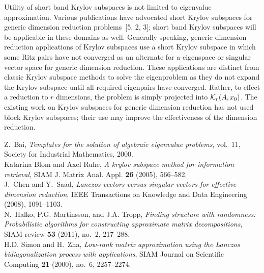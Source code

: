 \documentclass{report}
\begin{document}
Utility of short band Krylov subspaces is not limited to eigenvalue
approximation. Various publications have advocated short Krylov
subspaces for generic dimension reduction problems~[5, 2, 3]; short band Krylov
subspaces will be applicable in these domains as well. Generally
speaking, generic dimension reduction applications of Krylov subspaces
use a short Krylov subspace in which some Ritz pairs have not
converged as an alternate for a eigenspace or singular vector space
for generic dimension reduction. These applications are distinct from
classic Krylov subspace methods to solve the eigenproblem as they do
not expand the Krylov subspace until all required eigenpairs have
converged. Rather, to effect a reduction to $r$ dimensions, the
problem is simply projected into $\mathcal K_{r}(A,x_0)$. The existing work
on Krylov subspaces for generic dimension reduction has not used block
Krylov subspaces; their use may improve the effectiveness of the
dimension reduction.\\


\newcommand{\bysame}{\leavevmode\hbox to3em{\hrulefill}\thinspace}

\noindent [1] Z.~Bai, \emph{Templates for the solution of algebraic eigenvalue problems},
vol.~11, Society for Industrial Mathematics, 2000. \\

\noindent [2] Katarina Blom and Axel Ruhe, \emph{A krylov subspace method
for information retrieval}, SIAM J.
Matrix Anal. Appl. \textbf{26} (2005), 566--582. \\

\noindent [3] J.~Chen and Y.~Saad, \emph{{Lanczos vectors versus singular vectors for
effective dimension reduction}}, IEEE Transactions on Knowledge and Data
Engineering (2008), 1091--1103. \\


\noindent [4] N.~Halko, P.G. Martinsson, and J.A. Tropp, \emph{Finding structure with
randomness: Probabilistic algorithms for constructing approximate matrix
decompositions}, SIAM review \textbf{53} (2011), no.~2, 217--288. \\

\noindent [5] H.D. Simon and H.~Zha, \emph{{Low-rank matrix approximation
using the Lanczos
bidiagonalization process with applications}}, SIAM Journal on Scientific
Computing \textbf{21} (2000), no.~6, 2257--2274. \\
\end{document}
